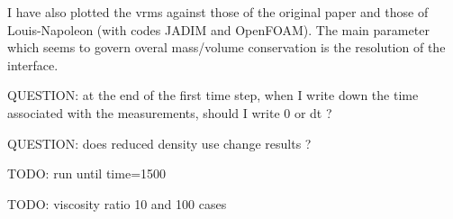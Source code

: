 I have also plotted the vrms against those of the original paper and those of Louis-Napoleon \etal \cite{logb20}
(with codes JADIM and OpenFOAM). 
The main parameter which seems to govern overal mass/volume conservation is the resolution of the interface. 

QUESTION: at the end of the first time step, when I write down the time associated with the measurements, should I write 0
or dt ?

QUESTION: does reduced density use change results ?

TODO: run until time=1500

TODO: viscosity ratio 10 and 100 cases

